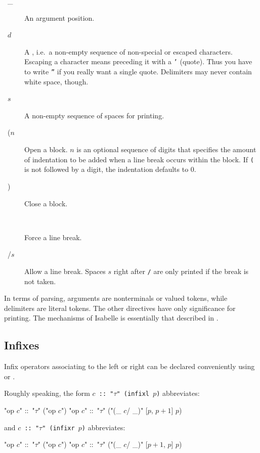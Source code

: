 \begin{description}
  \item[~\ttindex_~] An argument position.

  \item[~$d$~] A , i.e.\ a non-empty sequence of
    non-special or escaped characters. Escaping a 
    character means preceding it with a {\tt '}
    (quote). Thus you have to write {\tt ''} if you really want a single
    quote. Delimiters may never contain white space, though.

  \item[~$s$~] A non-empty sequence of spaces
    for printing.

  \item[~{\ttindex($n$}~] Open a block. $n$ is
    an optional sequence of digits that specifies the amount of indentation
    to be added when a line break occurs within the block. If {\tt(} is not
    followed by a digit, the indentation defaults to $0$.

  \item[~\ttindex)~] Close a block.

  \item[~\ttindex{//}~] Force a line break.

  \item[~\ttindex/$s$~] Allow a line break.
    Spaces $s$ right after {\tt /} are only printed if the break is not
    taken.
\end{description}

In terms of parsing, arguments are nonterminals or valued tokens, while
delimiters are literal tokens. The other directives have only significance
for printing. The  mechanisms of Isabelle is
essentially that described in \cite{FIXME:ML_for_the_Working_Programmer}.


\subsection{Infixes}

Infix operators associating to the left or right can be declared
conveniently using  or .

Roughly speaking, the form {\tt $c$ ::\ "$\tau$" (infixl $p$)} abbreviates:
\begin{ttbox}
"op \(c\)" ::\ "\(\tau\)"   ("op \(c\)")
"op \(c\)" ::\ "\(\tau\)"   ("(_ \(c\)/ _)" [\(p\), \(p + 1\)] \(p\))
\end{ttbox}
and {\tt $c$ ::\ "$\tau$" (infixr $p$)} abbreviates:
\begin{ttbox}
"op \(c\)" ::\ "\(\tau\)"   ("op \(c\)")
"op \(c\)" ::\ "\(\tau\)"   ("(_ \(c\)/ _)" [\(p + 1\), \(p\)] \(p\))
\end{ttbox}

